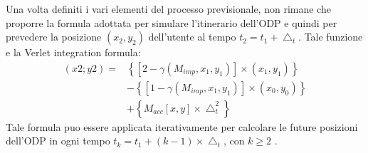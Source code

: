 Una volta definiti i vari elementi del processo previsionale, non rimane che
proporre la formula adottata per simulare l'itinerario dell'ODP e quindi per
prevedere la posizione $(x_{2},y_{2})$ dell'utente al tempo $t_{2} = t_{1} +\bigtriangleup_{t}$. Tale funzione
e la Verlet integration formula:
\begin{equation}
\begin{matrix}
(x2; y2) = & \left \{ [2 - \gamma(M_{imp},x_{1},y_{1})] \times (x_{1},y_{1}) \right \}\\
 & - \left \{ [1 - \gamma(M_{imp},x_{1},y_{1})] \times (x_{0},y_{0}) \right \} \\
 & + \left \{ M_{acc}[x,y] \times \bigtriangleup_{t}^{2} \right \}
\end{matrix}
\end{equation}
Tale formula puo essere applicata iterativamente per calcolare le future
posizioni dell'ODP in ogni tempo $t_{k} = t_{1} + (k - 1) \times \bigtriangleup_{t}$, con $k \geq 2$ .

